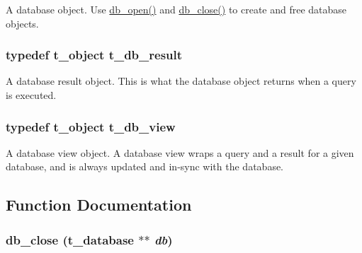 A database object. Use \hyperlink{group__database_gac709a497fcc55817c1c9292bd59eb03f}{db\_\-open()} and \hyperlink{group__database_ga697cbcbe4c14944fc5a4a535039f5e1b}{db\_\-close()} to create and free database objects. \hypertarget{group__database_gae34db00cb98960e94b5ca58a7c21c362}{
\subsubsection[{t\_\-db\_\-result}]{\setlength{\rightskip}{0pt plus 5cm}typedef {\bf t\_\-object} {\bf t\_\-db\_\-result}}}
\label{group__database_gae34db00cb98960e94b5ca58a7c21c362}


A database result object. This is what the database object returns when a query is executed. \hypertarget{group__database_gac9ea40a519578e26498dd61ea98b5cf2}{
\subsubsection[{t\_\-db\_\-view}]{\setlength{\rightskip}{0pt plus 5cm}typedef {\bf t\_\-object} {\bf t\_\-db\_\-view}}}
\label{group__database_gac9ea40a519578e26498dd61ea98b5cf2}


A database view object. A database view wraps a query and a result for a given database, and is always updated and in-\/sync with the database. 

\subsection{Function Documentation}
\hypertarget{group__database_ga697cbcbe4c14944fc5a4a535039f5e1b}{
\subsubsection[{db\_\-close}]{ db\_\-close ({\bf t\_\-database} $\ast$$\ast$ {\em db})}}
\label{group__database_ga697cbcbe4c14944fc5a4a535039f5e1b}


